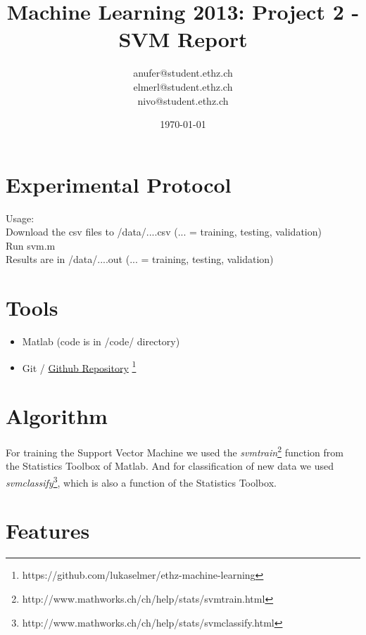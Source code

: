 \documentclass[a4paper, 11pt]{article}
\title{Machine Learning 2013: Project 2 - SVM Report}
\author{anufer@student.ethz.ch\\ elmerl@student.ethz.ch\\ nivo@student.ethz.ch\\}
\date{\today}
\begin{document}
\maketitle

\section*{Experimental Protocol}
Usage:\\
Download the csv files to /data/....csv (... = training, testing, validation)\\
Run svm.m \\
Results are in /data/....out (... = training, testing, validation)

\section{Tools}

\begin{itemize}
\item Matlab (code is in /code/ directory)
\item Git / \href{https://github.com/lukaselmer/ethz-machine-learning}{Github Repository} \footnote{https://github.com/lukaselmer/ethz-machine-learning}
\end{itemize}

\section{Algorithm}
\label{sec:Algorithm}
For training the Support Vector Machine we used the \textit{svmtrain}\footnote{http://www.mathworks.ch/ch/help/stats/svmtrain.html} function from the Statistics Toolbox of Matlab. And for classification of new data we used \textit{svmclassify}\footnote{http://www.mathworks.ch/ch/help/stats/svmclassify.html}, which is also a function of the Statistics Toolbox.

\section{Features}
\label{sec:Features}
\end{document}
